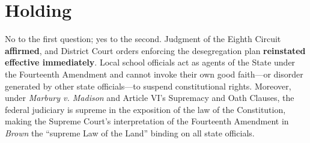 \documentclass[12pt]{article}
\begin{document}
\section{Holding}
No to the first question; yes to the second. Judgment of the Eighth Circuit \textbf{affirmed}, and District Court orders enforcing the desegregation plan \textbf{reinstated effective immediately}. Local school officials act as agents of the State under the Fourteenth Amendment and cannot invoke their own good faith---or disorder generated by other state officials---to suspend constitutional rights. Moreover, under \textit{Marbury v. Madison} and Article VI's Supremacy and Oath Clauses, the federal judiciary is supreme in the exposition of the law of the Constitution, making the Supreme Court's interpretation of the Fourteenth Amendment in \textit{Brown} the ``supreme Law of the Land'' binding on all state officials.
\end{document}

